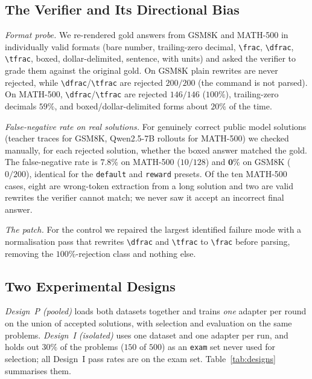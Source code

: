 \documentclass[runningheads]{llncs}
\begin{document}
\subsection{The Verifier and Its Directional Bias}
\label{sec:verifier}

\emph{Format probe.} We re-rendered gold answers from GSM8K and MATH-500 in
individually valid formats (bare number, trailing-zero decimal, \verb|\frac|,
\verb|\dfrac|, \verb|\tfrac|, boxed, dollar-delimited, sentence, with units) and
asked the verifier to grade them against the original gold. On GSM8K plain
rewrites are never rejected, while \verb|\dfrac|/\verb|\tfrac| are rejected
$200/200$ (the command is not parsed). On MATH-500, \verb|\dfrac|/\verb|\tfrac|
are rejected $146/146$ ($100\%$), trailing-zero decimals $59\%$, and
boxed/dollar-delimited forms about $20\%$ of the time.

\emph{False-negative rate on real solutions.} For genuinely correct public
model solutions (teacher traces for GSM8K, Qwen2.5-7B rollouts for MATH-500) we
checked manually, for each rejected solution, whether the boxed answer matched the
gold. The false-negative rate is $\mathbf{7.8\%}$ on MATH-500 ($10/128$) and
$\mathbf{0\%}$ on GSM8K ($0/200$), identical for the \texttt{default} and
\texttt{reward} presets. Of the ten MATH-500 cases, eight are wrong-token
extraction from a long solution and two are valid rewrites the verifier cannot
match; we never saw it accept an incorrect final answer.

\emph{The patch.} For the control we repaired the largest identified failure mode
with a normalisation pass that rewrites \verb|\dfrac| and \verb|\tfrac| to
\verb|\frac| before parsing, removing the $100\%$-rejection class and nothing else.

\subsection{Two Experimental Designs}
\label{sec:designs}

\emph{Design~P (pooled)} loads both datasets together and trains \emph{one}
adapter per round on the union of accepted solutions, with selection and
evaluation on the same problems. \emph{Design~I (isolated)} uses one dataset and
one adapter per run, and holds out $30\%$ of the problems ($150$ of $500$) as an
\texttt{exam} set never used for selection; all Design~I pass rates are on the exam
set. Table~\ref{tab:designs} summarises them.
\end{document}
